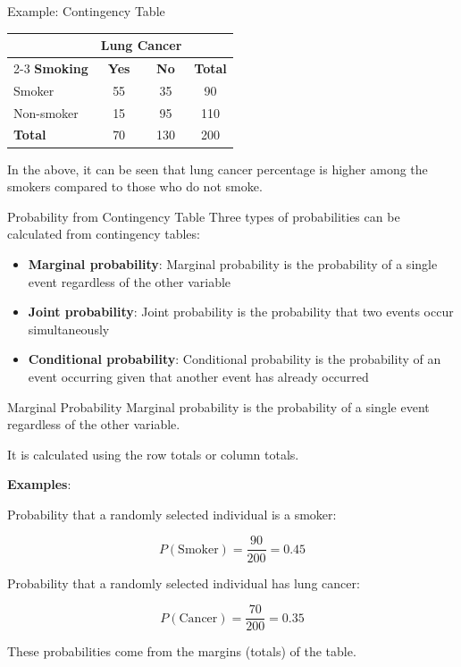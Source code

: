 \documentclass[12pt, aspectratio=169]{beamer}
\begin{document}
    \begin{frame}{Example: Contingency Table}
        \begin{center}
        \begin{tabular}{l|cc|c}
            \toprule
             & \multicolumn{2}{c|}{\textbf{Lung Cancer}} & \\
            \cmidrule(lr){2-3}
            \textbf{Smoking}   & \textbf{Yes} & \textbf{No} & \textbf{Total} \\
            \midrule
            Smoker                 & 55            & 35           & 90 \\
            Non-smoker             & 15            & 95           & 110 \\
            \midrule
            \textbf{Total}         & 70            & 130          & 200 \\
            \bottomrule
        \end{tabular}
        \end{center}
        \vspace{0.5em}
        In the above, it can be seen that lung cancer percentage is higher among the smokers compared to those who do not smoke.
    \end{frame}


	\begin{frame}{Probability from Contingency Table}
		Three types of probabilities can be calculated from contingency tables:
		\begin{itemize}
			\item \textbf{Marginal probability}: Marginal probability is the probability of a single event regardless of the other variable
			\item \textbf{Joint probability}: Joint probability is the probability that two events occur simultaneously
			\item \textbf{Conditional probability}: Conditional probability is the probability of an event occurring given that another event has already occurred
		\end{itemize}
	\end{frame}


	\begin{frame}{Marginal Probability}
		Marginal probability is the probability of a single event regardless of the other variable.

		It is calculated using the row totals or column totals.

		\textbf{Examples}:

		Probability that a randomly selected individual is a smoker:

		\[
		P(\text{Smoker}) = \frac{90}{200} = 0.45
		\]

		Probability that a randomly selected individual has lung cancer:

		\[
		P(\text{Cancer}) = \frac{70}{200} = 0.35
		\]

		These probabilities come from the margins (totals) of the table.
	\end{frame}
\end{document}
